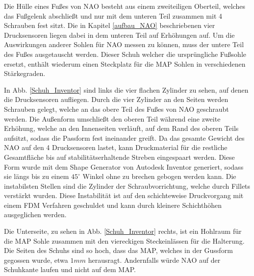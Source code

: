 Die Hülle eines Fußes von NAO besteht aus einem zweiteiligen Oberteil, welches das Fußgelenk abschließt und nur mit dem unteren Teil zusammen mit 4 Schrauben fest sitzt. Die in Kapitel \ref{aufbau_NAO} beschriebenen vier Drucksensoren liegen dabei in dem unteren Teil auf Erhöhungen auf. Um die Auswirkungen anderer Sohlen für NAO messen zu können, muss der untere Teil des Fußes ausgetauscht werden. Dieser 	\glqq Schuh\grqq{} welcher die ursprüngliche Fußsohle ersetzt, enthält wiederum einen Steckplatz für die MAP Sohlen in verschiedenen Stärkegraden. 

In Abb. \ref{Schuh_Inventor} sind links die vier flachen Zylinder zu sehen, auf denen die Drucksensoren aufliegen. Durch die vier Zylinder an den Seiten werden Schrauben gelegt, welche an das obere Teil des Fußes von NAO geschraubt werden. Die Außenform umschließt den oberen Teil während eine zweite Erhöhung, welche an den Innenseiten verläuft, auf dem Rand des oberen Teils aufsitzt, sodass die Passform fest ineinander greift. Da das gesamte Gewicht des NAO auf den 4 Drucksensoren lastet, kann Druckmaterial für die restliche Gesamtfläche bis auf stabilitätserhaltende Streben eingespaart werden. Diese Form wurde mit dem Shape Generator von Autodesk Inventor generiert, sodass sie längs bis zu einem $45^\circ$ Winkel ohne zu brechen gebogen werden kann. Die instabilsten Stellen sind die Zylinder der Schraubvorrichtung, welche durch Fillets verstärkt wurden. Diese Instabilität ist auf den schichteweise Druckvorgang mit einem FDM Verfahren geschuldet und kann durch kleinere Schichthöhen ausgeglichen werden.

Die Unterseite, zu sehen in Abb. \ref{Schuh_Inventor} rechts, ist ein Hohlraum für die MAP Sohle zusammen mit den viereckigen Steckeinlässen für die Halterung. Die Seiten des Schuhs sind so hoch, dass das MAP, welches in der Gussform gegossen wurde, etwa $1 \unit{mm}$ herausragt. Andernfalls würde NAO auf der Schuhkante laufen und nicht auf dem MAP.  

